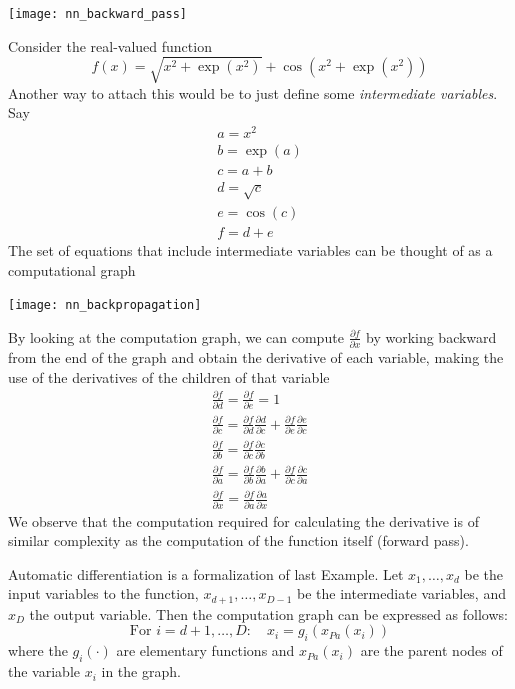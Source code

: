 \documentclass{article}
\begin{document}
\begin{center}
    \texttt{[image: nn\_backward\_pass]}
\end{center}
\begin{example}
    Consider the real-valued function 
    $$f(x)=\sqrt{x^2+\exp(x^2)}+\cos(x^2+\exp(x^2))$$
    Another way to attach this would be to just define some \textit{intermediate
    variables}. Say 
    $$
    \begin{aligned}
        a=x^2\\
        b=\exp(a)\\ 
        c=a+b\\ 
        d=\sqrt{c}\\ 
        e=\cos(c)\\ 
        f=d+e
    \end{aligned}
    $$
    The set of equations that include intermediate variables can be thought of
    as a computational graph 
    \begin{center}
        \texttt{[image: nn\_backpropagation]}
    \end{center}
    By looking at the computation graph, we can compute
    $\frac{\partial{f}}{\partial{x}}$ by working backward from the end of the
    graph and obtain the derivative of each variable, making the use of the
    derivatives of the children of that variable
    $$\begin{aligned}
        \frac{\partial{f}}{\partial{d}}=\frac{\partial{f}}{\partial{e}}=1 \\
        \frac{\partial{f}}{\partial{c}}=\frac{\partial{f}}{\partial{d}}\frac{\partial{d}}{\partial{c}}+\frac{\partial{f}}{\partial{e}}\frac{\partial{e}}{\partial{c}}
        \\ 
        \frac{\partial{f}}{\partial{b}}=\frac{\partial{f}}{\partial{c}}\frac{\partial{c}}{\partial{b}}
        \\
        \frac{\partial{f}}{\partial{a}}=\frac{\partial{f}}{\partial{b}}\frac{\partial{b}}{\partial{a}}+\frac{\partial{f}}{\partial{c}}\frac{\partial{c}}{\partial{a}}
        \\ 
        \frac{\partial{f}}{\partial{x}}=\frac{\partial{f}}{\partial{a}}\frac{\partial{a}}{\partial{x}}
    \end{aligned}$$
    We observe that the computation required for calculating the derivative is
    of similar complexity as the computation of the function itself (forward
    pass).
\end{example}
Automatic differentiation is a formalization of last Example. Let
$x_1,\ldots,x_d$ be the input variables to the function,
$x_{d+1},\ldots,x_{D-1}$ be the intermediate variables, and $x_D$ the output
variable. Then the computation graph can be expressed as follows:
\begin{equation}\label{eq:forward_pass}
    \text{For }i=d+1,\ldots,D:\quad x_i=g_i(x_{Pa}(x_i))
\end{equation}
where the $g_i(\cdot)$ are elementary functions and $x_{Pa}(x_i)$ are the
parent nodes of the variable $x_i$ in the graph.
\end{document}
